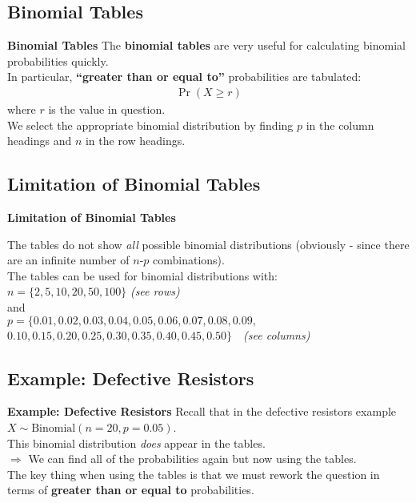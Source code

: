 \documentclass[compress]{beamer}        %
\makeatletter
\newcommand{\tcb}{\textcolor{beamer@blendedblue}}
\makeatother
\begin{document}
\subsection{Binomial Tables}
\begin{frame}{\bf \tcb{Binomial Tables}}
The {\bf binomial tables} are very useful for calculating binomial probabilities quickly.\\[1cm]

In particular, {\bf ``greater than or equal to''} probabilities are tabulated:
\begin{align*}
\boxed{\Pr(X \ge r)}
\end{align*}
where $r$ is the value in question.\\[1cm]

We select the appropriate binomial distribution by finding $p$ in the column headings and $n$ in the row headings.

\end{frame}


\subsection{Limitation of Binomial Tables}
\begin{frame}{\bf \tcb{Limitation of Binomial Tables}}

The tables do not show \emph{all} possible binomial distributions (obviously - since there are an infinite number of $n$-$p$ combinations).\\[0.7cm]

The tables can be used for binomial distributions with:\\[0.4cm]
$n = \{2, 5, 10, 20, 50, 100\}$ \quad \emph{(see rows)}\\[0.4cm]
and\\[0.4cm]
$p = \{0.01,0.02,0.03,0.04,0.05,0.06,0.07,0.08,0.09,$\\[-0.3cm]\quad\newline
{}$0.10,0.15,0.20,0.25,0.30,0.35,0.40,0.45,0.50\}$ \,\, \emph{(see columns)}

\end{frame}



\subsection{Example: Defective Resistors}
\begin{frame}{\bf \tcb{Example: Defective Resistors}}
Recall that in the defective resistors example $X \sim \text{Binomial}(n=20, p=0.05)$.\\[0.4cm]
This binomial distribution \emph{does} appear in the tables. \\[1cm]


$\Rightarrow$ We can find all of the probabilities again but now using the tables.\\[1cm]

The key thing when using the tables is that we must rework the question in terms of {\bf greater than or equal to} probabilities.

\end{frame}
\end{document}
